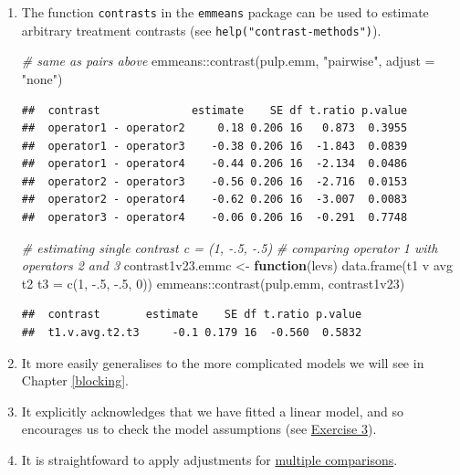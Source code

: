 \documentclass[
]{book}
\newenvironment{Shaded}{\begin{snugshade}}{\end{snugshade}}
\newcommand{\AttributeTok}[1]{\textcolor[rgb]{0.77,0.63,0.00}{#1}}
\newcommand{\CommentTok}[1]{\textcolor[rgb]{0.56,0.35,0.01}{\textit{#1}}}
\newcommand{\ControlFlowTok}[1]{\textcolor[rgb]{0.13,0.29,0.53}{\textbf{#1}}}
\newcommand{\DecValTok}[1]{\textcolor[rgb]{0.00,0.00,0.81}{#1}}
\newcommand{\FunctionTok}[1]{\textcolor[rgb]{0.00,0.00,0.00}{#1}}
\newcommand{\NormalTok}[1]{#1}
\newcommand{\OtherTok}[1]{\textcolor[rgb]{0.56,0.35,0.01}{#1}}
\newcommand{\SpecialCharTok}[1]{\textcolor[rgb]{0.00,0.00,0.00}{#1}}
\newcommand{\StringTok}[1]{\textcolor[rgb]{0.31,0.60,0.02}{#1}}
\theoremstyle{definition}
\theoremstyle{definition}
\theoremstyle{definition}
\theoremstyle{definition}
\theoremstyle{remark}
\begin{document}
\begin{enumerate}
\def\labelenumi{\alph{enumi}.}
\item
  The function \texttt{contrasts} in the \texttt{emmeans} package can be used to estimate arbitrary treatment contrasts (see \texttt{help("contrast-methods")}).

\begin{Shaded}
\begin{Highlighting}[]
\CommentTok{\# same as \textasciigrave{}pairs\textasciigrave{} above}
\NormalTok{emmeans}\SpecialCharTok{::}\FunctionTok{contrast}\NormalTok{(pulp.emm, }\StringTok{"pairwise"}\NormalTok{, }\AttributeTok{adjust =} \StringTok{"none"}\NormalTok{)}
\end{Highlighting}
\end{Shaded}

\begin{verbatim}
##  contrast              estimate    SE df t.ratio p.value
##  operator1 - operator2     0.18 0.206 16   0.873  0.3955
##  operator1 - operator3    -0.38 0.206 16  -1.843  0.0839
##  operator1 - operator4    -0.44 0.206 16  -2.134  0.0486
##  operator2 - operator3    -0.56 0.206 16  -2.716  0.0153
##  operator2 - operator4    -0.62 0.206 16  -3.007  0.0083
##  operator3 - operator4    -0.06 0.206 16  -0.291  0.7748
\end{verbatim}

\begin{Shaded}
\begin{Highlighting}[]
\CommentTok{\# estimating single contrast c = (1, {-}.5, {-}.5)}
\CommentTok{\# comparing operator 1 with operators 2 and 3}
\NormalTok{contrast1v23.emmc }\OtherTok{\textless{}{-}} \ControlFlowTok{function}\NormalTok{(levs) }
  \FunctionTok{data.frame}\NormalTok{(}\StringTok{\textquotesingle{}t1 v avg t2 t3\textquotesingle{}} \OtherTok{=} \FunctionTok{c}\NormalTok{(}\DecValTok{1}\NormalTok{, }\SpecialCharTok{{-}}\NormalTok{.}\DecValTok{5}\NormalTok{, }\SpecialCharTok{{-}}\NormalTok{.}\DecValTok{5}\NormalTok{, }\DecValTok{0}\NormalTok{))}
\NormalTok{emmeans}\SpecialCharTok{::}\FunctionTok{contrast}\NormalTok{(pulp.emm, }\StringTok{\textquotesingle{}contrast1v23\textquotesingle{}}\NormalTok{)}
\end{Highlighting}
\end{Shaded}

\begin{verbatim}
##  contrast       estimate    SE df t.ratio p.value
##  t1.v.avg.t2.t3     -0.1 0.179 16  -0.560  0.5832
\end{verbatim}
\item
  It more easily generalises to the more complicated models we will see in Chapter \ref{blocking}.
\item
  It explicitly acknowledges that we have fitted a linear model, and so encourages us to check the model assumptions (see \protect\hyperlink{nap-black-ex}{Exercise 3}).
\item
  It is straightfoward to apply adjustments for \protect\hyperlink{multiple-comp}{multiple comparisons}.
\end{enumerate}
\end{document}
